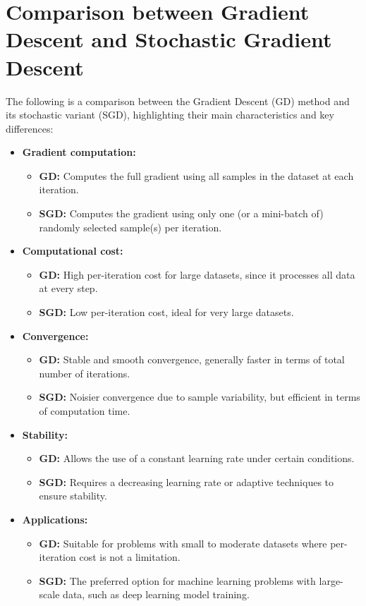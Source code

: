 \documentclass[12pt, letterpaper,conference]{IEEEtran}
\begin{document}
\section{Comparison between Gradient Descent and Stochastic Gradient Descent}

The following is a comparison between the Gradient Descent (GD) method and its stochastic variant (SGD), highlighting their main characteristics and key differences:

\begin{itemize}
    \item \textbf{Gradient computation:}
    \begin{itemize}
        \item \textbf{GD:} Computes the full gradient using all samples in the dataset at each iteration.
        \item \textbf{SGD:} Computes the gradient using only one (or a mini-batch of) randomly selected sample(s) per iteration.
    \end{itemize}
    
    \item \textbf{Computational cost:}
    \begin{itemize}
        \item \textbf{GD:} High per-iteration cost for large datasets, since it processes all data at every step.
        \item \textbf{SGD:} Low per-iteration cost, ideal for very large datasets.
    \end{itemize}
    
    \item \textbf{Convergence:}
    \begin{itemize}
        \item \textbf{GD:} Stable and smooth convergence, generally faster in terms of total number of iterations.
        \item \textbf{SGD:} Noisier convergence due to sample variability, but efficient in terms of computation time.
    \end{itemize}
    
    \item \textbf{Stability:}
    \begin{itemize}
        \item \textbf{GD:} Allows the use of a constant learning rate under certain conditions.
        \item \textbf{SGD:} Requires a decreasing learning rate or adaptive techniques to ensure stability.
    \end{itemize}
    
    \item \textbf{Applications:}
    \begin{itemize}
        \item \textbf{GD:} Suitable for problems with small to moderate datasets where per-iteration cost is not a limitation.
        \item \textbf{SGD:} The preferred option for machine learning problems with large-scale data, such as deep learning model training.
    \end{itemize}
\end{itemize}
\end{document}
